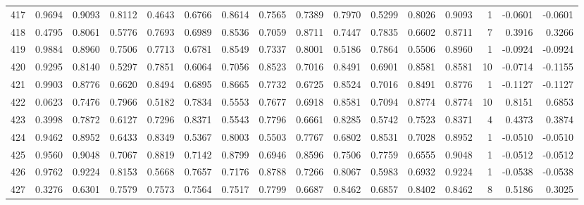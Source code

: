 \begin{tabular}{lrrrrrrrrrrrrrrr}
417 &      0.9694 &  0.9093 &  0.8112 &  0.4643 &  0.6766 &  0.8614 &  0.7565 &  0.7389 &  0.7970 &  0.5299 &   0.8026 &     0.9093 &      1 &                   -0.0601 &                    -0.0601 \\
418 &      0.4795 &  0.8061 &  0.5776 &  0.7693 &  0.6989 &  0.8536 &  0.7059 &  0.8711 &  0.7447 &  0.7835 &   0.6602 &     0.8711 &      7 &                    0.3916 &                     0.3266 \\
419 &      0.9884 &  0.8960 &  0.7506 &  0.7713 &  0.6781 &  0.8549 &  0.7337 &  0.8001 &  0.5186 &  0.7864 &   0.5506 &     0.8960 &      1 &                   -0.0924 &                    -0.0924 \\
420 &      0.9295 &  0.8140 &  0.5297 &  0.7851 &  0.6064 &  0.7056 &  0.8523 &  0.7016 &  0.8491 &  0.6901 &   0.8581 &     0.8581 &     10 &                   -0.0714 &                    -0.1155 \\
421 &      0.9903 &  0.8776 &  0.6620 &  0.8494 &  0.6895 &  0.8665 &  0.7732 &  0.6725 &  0.8524 &  0.7016 &   0.8491 &     0.8776 &      1 &                   -0.1127 &                    -0.1127 \\
422 &      0.0623 &  0.7476 &  0.7966 &  0.5182 &  0.7834 &  0.5553 &  0.7677 &  0.6918 &  0.8581 &  0.7094 &   0.8774 &     0.8774 &     10 &                    0.8151 &                     0.6853 \\
423 &      0.3998 &  0.7872 &  0.6127 &  0.7296 &  0.8371 &  0.5543 &  0.7796 &  0.6661 &  0.8285 &  0.5742 &   0.7523 &     0.8371 &      4 &                    0.4373 &                     0.3874 \\
424 &      0.9462 &  0.8952 &  0.6433 &  0.8349 &  0.5367 &  0.8003 &  0.5503 &  0.7767 &  0.6802 &  0.8531 &   0.7028 &     0.8952 &      1 &                   -0.0510 &                    -0.0510 \\
425 &      0.9560 &  0.9048 &  0.7067 &  0.8819 &  0.7142 &  0.8799 &  0.6946 &  0.8596 &  0.7506 &  0.7759 &   0.6555 &     0.9048 &      1 &                   -0.0512 &                    -0.0512 \\
426 &      0.9762 &  0.9224 &  0.8153 &  0.5668 &  0.7657 &  0.7176 &  0.8788 &  0.7266 &  0.8067 &  0.5983 &   0.6932 &     0.9224 &      1 &                   -0.0538 &                    -0.0538 \\
427 &      0.3276 &  0.6301 &  0.7579 &  0.7573 &  0.7564 &  0.7517 &  0.7799 &  0.6687 &  0.8462 &  0.6857 &   0.8402 &     0.8462 &      8 &                    0.5186 &                     0.3025 \\

\end{tabular}
